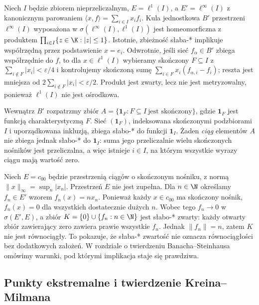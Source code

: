 \begin{przyklad}\label{ex:uncountable-product}
Niech $I$ będzie zbiorem nieprzeliczalnym,
$E=\ell^1(I)$, a $E'=\ell^\infty(I)$ z kanonicznym parowaniem
$\langle x,f\rangle=\sum_{i\in I}x_i f_i$.
Kula jednostkowa $B'$ przestrzeni $\ell^\infty(I)$
wyposażona w $\sigma(\ell^\infty(I),\ell^1(I))$
jest homeomorficzna z produktem
$\prod_{i\in I}\{z\in\K:|z|\le1\}$.
Istotnie, zbieżność słaba-* implikuje współrzędną przez
podstawienie $x=e_i$. Odwrotnie, jeśli sieć $f_\alpha\in B'$
zbiega współrzędnie do $f$, to dla $x\in\ell^1(I)$
wybieramy skończony $F\subseteq I$ z
$\sum_{i\notin F}|x_i|<\varepsilon/4$ i kontrolujemy
skończoną sumę $\sum_{i\in F}x_i(f_{\alpha,i}-f_i)$;
reszta jest mniejsza od $2\sum_{i\notin F}|x_i|<\varepsilon/2$.
Produkt jest zwarty, lecz nie jest metryzowalny, ponieważ
$\ell^1(I)$ nie jest ośrodkowa.

Wewnątrz $B'$ rozpatrzmy zbiór
$A=\{\mathbf 1_F:F\subseteq I\ \text{jest skończony}\}$,
gdzie $\mathbf 1_F$ jest funkcją charakterystyczną $F$.
Sieć $(\mathbf 1_F)$, indeksowana skończonymi podzbiorami $I$
i uporządkowana inkluzją, zbiega słabo-* do funkcji
$\mathbf 1_I$. Żaden \emph{ciąg} elementów $A$ nie zbiega
jednak słabo-* do $\mathbf 1_I$: suma jego przeliczalnie wielu
skończonych nośników jest przeliczalna, a więc istnieje
$i\in I$, na którym wszystkie wyrazy ciągu mają wartość zero.
\end{przyklad}

\begin{przyklad}
\label{ex:compact-not-equicont}
Niech $E=c_{00}$ będzie przestrzenią ciągów o skończonym nośniku,
z normą $\|x\|_\infty=\sup_n|x_n|$. Przestrzeń $E$ nie jest
zupełna. Dla $n\in\N$ określamy $f_n\in E'$ wzorem
$f_n(x)=n x_n$. Ponieważ każdy $x\in c_{00}$ ma skończony
nośnik, $f_n(x)=0$ dla wszystkich dostatecznie dużych $n$.
Wobec tego $f_n\to0$ w $\sigma(E',E)$, a zbiór
$K=\{0\}\cup\{f_n:n\in\N\}$ jest słabo-* zwarty:
każdy otwarty zbiór zawierający zero zawiera prawie wszystkie $f_n$.
Jednak $\|f_n\|=n$, zatem $K$ nie jest równociągły.
To pokazuje, że słaba-* zwartość nie oznacza równociągłości
bez dodatkowych założeń. W rozdziale o twierdzeniu
Banacha--Steinhausa omówimy warunki, pod którymi implikacja
staje się prawdziwa.
\end{przyklad}

\subsection{Punkty ekstremalne i twierdzenie Kreina--Milmana}
\label{subsec:krein-milman}

